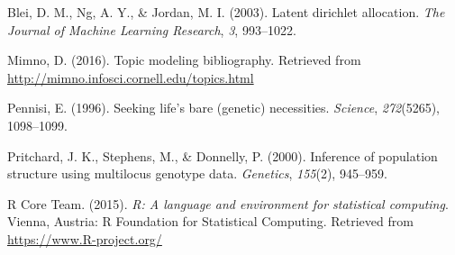 \documentclass[12pt,]{article}
\begin{document}
\hypertarget{ref-blei2003latent}{}
Blei, D. M., Ng, A. Y., \& Jordan, M. I. (2003). Latent dirichlet
allocation. \emph{The Journal of Machine Learning Research}, \emph{3},
993--1022.

\hypertarget{ref-mimno2016topic}{}
Mimno, D. (2016). Topic modeling bibliography. Retrieved from
\url{http://mimno.infosci.cornell.edu/topics.html}

\hypertarget{ref-pennisi1996seeking}{}
Pennisi, E. (1996). Seeking life's bare (genetic) necessities.
\emph{Science}, \emph{272}(5265), 1098--1099.

\hypertarget{ref-pritchard2000inference}{}
Pritchard, J. K., Stephens, M., \& Donnelly, P. (2000). Inference of
population structure using multilocus genotype data. \emph{Genetics},
\emph{155}(2), 945--959.

\hypertarget{ref-r2015}{}
R Core Team. (2015). \emph{R: A language and environment for statistical
computing}. Vienna, Austria: R Foundation for Statistical Computing.
Retrieved from \url{https://www.R-project.org/}
\end{document}
